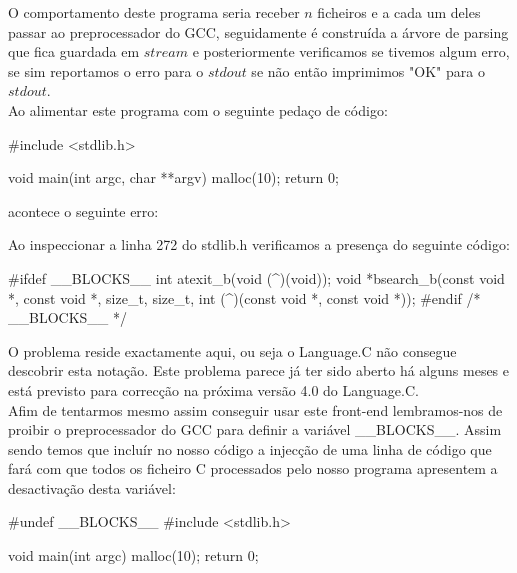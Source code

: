O comportamento deste programa seria receber $n$ ficheiros e a cada um deles passar ao preprocessador do GCC, seguidamente é construída a árvore de parsing que fica
guardada em $stream$ e posteriormente verificamos se tivemos algum erro, se sim reportamos o erro para o $stdout$ se não então imprimimos "OK" para o $stdout$.\\

Ao alimentar este programa com o seguinte pedaço de código:

\begin{haskell}
#include <stdlib.h>

void main(int argc, char **argv) {
	malloc(10);
	return 0;
}
\end{haskell}

acontece o seguinte erro:


Ao inspeccionar a linha 272 do stdlib.h verificamos a presença do seguinte código:

\begin{haskell}
#ifdef __BLOCKS__
int  atexit_b(void (^)(void));
void    *bsearch_b(const void *, const void *, size_t,
size_t, int (^)(const void *, const void *));
#endif /* __BLOCKS__ */
\end{haskell}

O problema reside exactamente aqui, ou seja o Language.C não consegue descobrir esta notação. Este problema parece já ter sido aberto há alguns meses e está previsto
para correcção na próxima versão 4.0 do Language.C.\\

Afim de tentarmos mesmo assim conseguir usar este front-end lembramos-nos de proibir o preprocessador do GCC para definir a variável \_\_BLOCKS\_\_. Assim sendo
temos que incluír no nosso código a injecção de uma linha de código que fará com que todos os ficheiro C processados pelo nosso programa apresentem a desactivação desta variável:

\begin{haskell}
#undef __BLOCKS__
#include <stdlib.h>

void main(int argc) {
	malloc(10);
	return 0;
}
\end{haskell}

